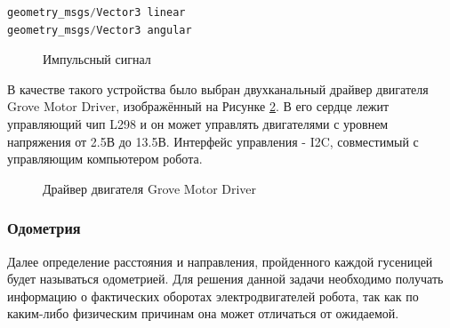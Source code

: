 \documentclass[12pt,a4paper]{scrartcl}
\begin{document}
					\begin{lstlisting}[language=C,caption={Формат сообщения geometry\_msgs/Twist},label={lst:TwistMsg}]
geometry_msgs/Vector3 linear
geometry_msgs/Vector3 angular
					\end{lstlisting}	
					
					\begin{figure}[h]
						\caption{Импульсный сигнал}
						\label{fig:Shim}
					\end{figure}
					
					В качестве такого устройства было выбран двухканальный драйвер двигателя Grove Motor Driver, изображённый на Рисунке \ref{fig:GroveMotorDriver}. В его сердце лежит управляющий чип L298 и он может управлять двигателями с уровнем напряжения от 2.5В до 13.5В. Интерфейс управления - I2C, совместимый с управляющим компьютером робота.
					
					\begin{figure}[h]
						\caption{Драйвер двигателя Grove Motor Driver}
						\label{fig:GroveMotorDriver}
					\end{figure}
					
				\subsubsection{Одометрия}
					Далее определение расстояния и направления, пройденного каждой гусеницей будет называться одометрией. Для решения данной задачи необходимо получать информацию о фактических оборотах электродвигателей робота, так как по каким-либо физическим причинам она может отличаться от ожидаемой.
					
\end{document}
